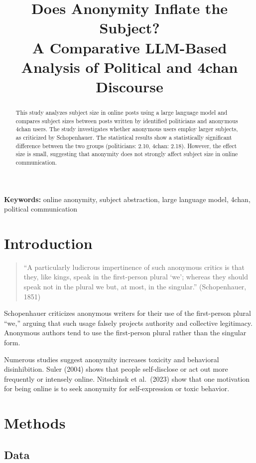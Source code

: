 \documentclass{article}
\title{Does Anonymity Inflate the Subject?\\
A Comparative LLM-Based Analysis of Political and 4chan Discourse}
\date{}
\begin{document}
\maketitle

\begin{abstract}
This study analyzes subject size in online posts using a 
large language model and compares subject sizes 
between posts written by identified politicians and anonymous 4chan users. 
The study investigates whether anonymous users employ larger subjects, as 
criticized by Schopenhauer. The statistical results show a statistically 
significant difference between the two groups (politicians: 2.10, 4chan: 2.18). 
However, the effect size is small, suggesting that anonymity does not strongly 
affect subject size in online communication.
\end{abstract}

\noindent
\textbf{Keywords:} online anonymity, subject abstraction, large language model, 4chan, political communication

\section{Introduction}

\begin{quote}
``A particularly ludicrous impertinence of such anonymous critics is that they,
like kings, speak in the first-person plural `we'; whereas they should speak
not in the plural we but, at most, in the singular.'' (Schopenhauer, 1851)
\end{quote}

Schopenhauer criticizes anonymous writers for their use of the 
first-person plural ``we,'' arguing that such usage falsely projects authority 
and collective legitimacy. Anonymous authors tend to use the first-person plural 
rather than the singular form.

Numerous studies suggest anonymity increases toxicity and behavioral 
disinhibition. Suler (2004) shows that people self-disclose or act out more 
frequently or intensely online. Nitschinsk et al.\ (2023) show that one motivation 
for being online is to seek anonymity for self-expression or toxic behavior.

\section{Methods}

\subsection{Data}
\end{document}
